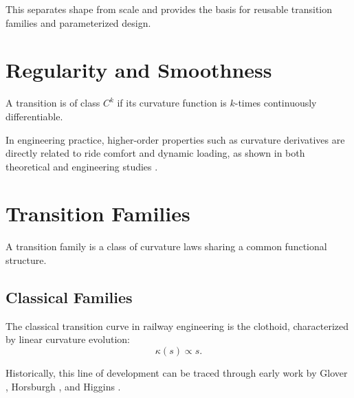 This separates shape from scale and provides the basis for reusable
transition families and parameterized design.

\section{Regularity and Smoothness}

\begin{definition}
A transition is of class $C^k$ if its curvature function is $k$-times
continuously differentiable.
\end{definition}

In engineering practice, higher-order properties such as curvature
derivatives are directly related to ride comfort and dynamic loading,
as shown in both theoretical and engineering studies
\cite{Mieloszyk2012Transition,Koc2017SmoothedEnds}.


\section{Transition Families}

\begin{definition}
A transition family is a class of curvature laws sharing a common
functional structure.
\end{definition}

\subsection{Classical Families}

The classical transition curve in railway engineering is the clothoid,
characterized by linear curvature evolution:
\[
\kappa(s)\propto s.
\]

Historically, this line of development can be traced through early work
by Glover \cite{Glover1900TransitionCurves},
Horsburgh \cite{Horsburgh1913TransitionCurve},
and Higgins \cite{Higgins1922TransitionSpiral}.

